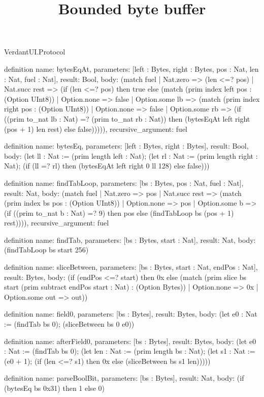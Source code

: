 \begin{lexlean}{VerdantUI.Protocol}
\title{Bounded byte buffer}
\begin{semanticmodule}
definition{
  name: bytesEqAt,
  parameters: [left : Bytes, right : Bytes, pos : Nat, len : Nat, fuel : Nat],
  result: Bool,
  body: (match fuel
    | Nat.zero => (len <=? pos)
    | Nat.succ rest => (if (len <=? pos) then true else
      (match (prim index left pos : (Option UInt8))
        | Option.none => false
        | Option.some lb => (match (prim index right pos : (Option UInt8))
          | Option.none => false
          | Option.some rb => (if ((prim to_nat lb : Nat) =? (prim to_nat rb : Nat)) then (bytesEqAt left right (pos + 1) len rest) else false))))),
  recursive_argument: fuel
}

definition{
  name: bytesEq,
  parameters: [left : Bytes, right : Bytes],
  result: Bool,
  body: (let ll : Nat := (prim length left : Nat);
    (let rl : Nat := (prim length right : Nat);
    (if (ll =? rl) then (bytesEqAt left right 0 ll 128) else false)))
}

definition{
  name: findTabLoop,
  parameters: [bs : Bytes, pos : Nat, fuel : Nat],
  result: Nat,
  body: (match fuel
    | Nat.zero => pos
    | Nat.succ rest => (match (prim index bs pos : (Option UInt8))
      | Option.none => pos
      | Option.some b => (if ((prim to_nat b : Nat) =? 9) then pos else (findTabLoop bs (pos + 1) rest)))),
  recursive_argument: fuel
}

definition{
  name: findTab,
  parameters: [bs : Bytes, start : Nat],
  result: Nat,
  body: (findTabLoop bs start 256)
}

definition{
  name: sliceBetween,
  parameters: [bs : Bytes, start : Nat, endPos : Nat],
  result: Bytes,
  body: (if (endPos <=? start) then 0x else (match (prim slice bs start (prim subtract endPos start : Nat) : (Option Bytes))
    | Option.none => 0x
    | Option.some out => out))
}

definition{
  name: field0,
  parameters: [bs : Bytes],
  result: Bytes,
  body: (let e0 : Nat := (findTab bs 0); (sliceBetween bs 0 e0))
}

definition{
  name: afterField0,
  parameters: [bs : Bytes],
  result: Bytes,
  body: (let e0 : Nat := (findTab bs 0); (let len : Nat := (prim length bs : Nat); (let s1 : Nat := (e0 + 1); (if (len <=? s1) then 0x else (sliceBetween bs s1 len)))))
}

definition{
  name: parseBoolBit,
  parameters: [bs : Bytes],
  result: Nat,
  body: (if (bytesEq bs 0x31) then 1 else 0)
}
\end{semanticmodule}
\end{lexlean}

